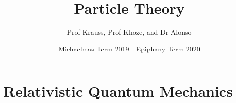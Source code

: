 \documentclass[a4paper, 11pt, normalem]{report}
\title{Particle Theory \vspace{-20pt}}
\author{Prof Krauss, Prof Khoze, and Dr Alonso}
\date{\vspace{-15pt}Michaelmas Term 2019 - Epiphany Term 2020}
\begin{document}
\maketitle
\tableofcontents

\part{Relativistic Quantum Mechanics}
\end{document}
